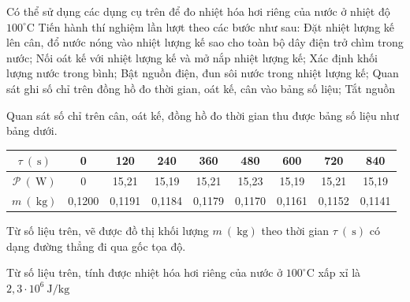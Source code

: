 \begin{ex}
\begin{center}
	\end{center}
	\choiceTF
	{\True Có thể sử dụng các dụng cụ trên để đo nhiệt hóa hơi riêng của nước ở nhiệt độ $100^\circ\mathrm{C}$}
	{\True Tiến hành thí nghiệm lần lượt theo các bước như sau: Đặt nhiệt lượng kế lên cân, đổ nước nóng vào nhiệt lượng kế sao cho toàn bộ dây điện trở chìm trong nước; Nối oát kế với nhiệt lượng kế và mở nắp nhiệt lượng kế; Xác định khối lượng nước trong bình; Bật nguồn điện, đun sôi nước trong nhiệt lượng kế; Quan sát ghi số chỉ trên đồng hồ đo thời gian, oát kế, cân vào bảng số liệu; Tắt nguồn}
	{Quan sát số chỉ trên cân, oát kế, đồng hồ đo thời gian thu được bảng số liệu như bảng dưới.\\
		\begin{center}
			\begin{tabular}{|c|c|c|c|c|c|c|c|c|}
				\hline
				$\tau\ (\ \mathrm{s})$ & 0 & 120 & 240 & 360 & 480 & 600 & 720 & 840 \\ 
				\hline
				$\mathcal{P}\ (\ \mathrm{W})$ & 0 & 15,21 & 15,19 & 15,21 & 15,23 & 15,19 & 15,21 & 15,19 \\ 
				\hline
				$m\ (\ \mathrm{kg})$ & 0,1200 & 0,1191 & 0,1184 & 0,1179 & 0,1170 & 0,1161 & 0,1152 & 0,1141 \\ 
				\hline
			\end{tabular}
		\end{center}
		Từ số liệu trên, vẽ được đồ thị khối lượng $m\ (\ \mathrm{kg})$ theo thời gian $\tau\ (\ \mathrm{s})$ có dạng đường thẳng đi qua gốc tọa độ.}
	{\True Từ số liệu trên, tính được nhiệt hóa hơi riêng của nước ở $100^\circ\mathrm{C}$ xấp xỉ là $2{,}3 \cdot 10^6\ \mathrm{J/kg}$}
	

\end{ex}
